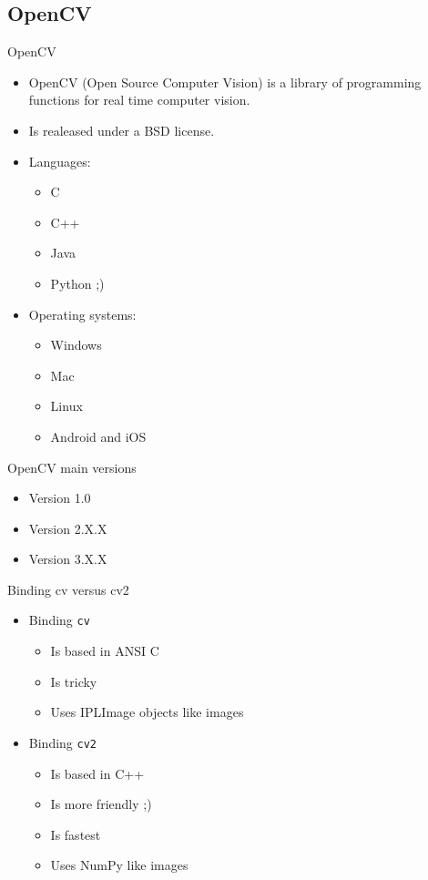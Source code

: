 \documentclass{beamer}
\begin{document}
\subsection{OpenCV}
\begin{frame}{OpenCV}
\transdissolve
  \pause
  \begin{itemize}[<+-| alert@+ >]
    \item OpenCV (Open Source Computer Vision) is a library of programming functions for real time computer vision.
    \item Is realeased under a BSD license.
    \item Languages:
      \begin{itemize}
	\item C
	\item C++
	\item Java
	\item Python ;)
      \end{itemize}
    \item Operating systems:
      \begin{itemize}
	\item Windows
	\item Mac
	\item Linux
	\item Android and iOS
      \end{itemize}
  \end{itemize}
\end{frame}

\begin{frame}{OpenCV main versions}
\transdissolve
  \pause
  \begin{itemize}[<+-| alert@+ >]
    \item Version 1.0
    \item Version 2.X.X
    \item Version 3.X.X
  \end{itemize}
\end{frame}

\begin{frame}{Binding cv versus cv2}
\transdissolve
  \pause
  \begin{itemize}[<+-| alert@+ >]
    \item Binding \texttt{cv}
       \begin{itemize}[<+-| alert@+ >]
        \item Is based in ANSI C
	\item Is tricky
	\item Uses IPLImage objects like images
       \end{itemize}
    \item Binding \texttt{cv2}
       \begin{itemize}[<+-| alert@+ >]
        \item Is based in C++
	\item Is more friendly ;)
	\item Is fastest
	\item Uses NumPy like images
       \end{itemize}
  \end{itemize}
\end{frame}
\end{document}
